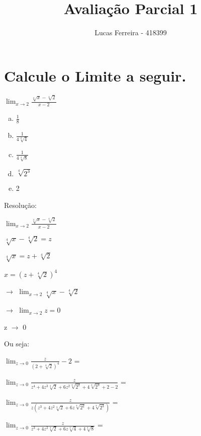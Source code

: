\documentclass{article}
\title{Avaliação Parcial 1}
\author{Lucas Ferreira - 418399}
\begin{document}
\maketitle

\section{Calcule o Limite a seguir.}
{\LARGE $ \lim_{x\to 2} {\frac {\sqrt[4] {x} - \sqrt[4]{2}}{x-2}} $}

\begin{enumerate}[(a)]
     \Large \item $\frac {1}{8}$
     \item $\frac {1}{4 \sqrt[2]{4}}$
     \item $\frac {1}{4 \sqrt[4]{8}}$
     \item $\sqrt[4] {2^3}$
     \item 2
\end{enumerate}

\begin{description}
    \item[Resolução:]
\end{description}

{\Large $ \lim_{x\to 2} {\frac {\sqrt[4] {x} - \sqrt[4]{2}}{x-2}} $}

{\Large $ \sqrt[4]{x} - \sqrt[4]{2} = z$}

{\Large $ \sqrt[4]{x} = z + \sqrt[4]{2}$}

{\Large $ x = (z + \sqrt[4]{2})^4$}

{\Large {$ \rightarrow $} $ \lim_{x\to 2} {\sqrt[4] {x} - \sqrt[4]{2} }
$}

{\Large {$ \rightarrow $} $ \lim_{x\to 2}  { z = 0}
$}

{\Large z {$ \rightarrow $} 0}

\begin{description}
    \item[Ou seja:]
\end{description}

{\Large $ \lim_{z\to 0} {\frac {z}{(2 + \sqrt[4]{2})^4} - 2} $} =

{\Large $ \lim_{z\to 0} {\frac {z}{z^4 + 4z^3 \sqrt[4]{2} + 6z^2 \sqrt[4]{2^2} + 4 \sqrt[4]{2^3} + 2 - 2}} $} =

{\Large $ \lim_{z\to 0} {\frac {z}{z(z^3 + 4z^2 \sqrt[4]{2} + 6z \sqrt[4]{2^2} + 4 \sqrt[4]{2^3})}} $} =

{\Large $ \lim_{z\to 0} {\frac {z}{z^3 + 4z^2 \sqrt[4]{2} + 6z \sqrt[4]{4} + 4 \sqrt[4]{8}}} $} =
\end{document}
